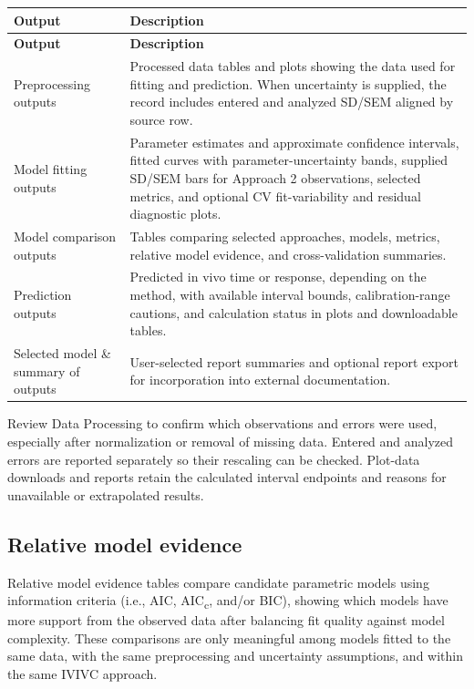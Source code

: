 \begin{longtable}{@{}>{\raggedright\arraybackslash}p{}>{\raggedright\arraybackslash}p{}@{}}
\toprule
\textbf{Output} & \textbf{Description} \\
\midrule
\endfirsthead
\toprule
\textbf{Output} & \textbf{Description} \\
\midrule
\endhead
Preprocessing outputs & Processed data tables and plots showing the data used for fitting and prediction. When uncertainty is supplied, the record includes entered and analyzed SD/SEM aligned by source row. \\
Model fitting outputs & Parameter estimates and approximate confidence intervals, fitted curves with parameter-uncertainty bands, supplied SD/SEM bars for Approach 2 observations, selected metrics, and optional CV fit-variability and residual diagnostic plots. \\
Model comparison outputs & Tables comparing selected approaches, models, metrics, relative model evidence, and cross-validation summaries. \\
Prediction outputs & Predicted in vivo time or response, depending on the method, with available interval bounds, calibration-range cautions, and calculation status in plots and downloadable tables. \\
Selected model \& summary of outputs & User-selected report summaries and optional report export for incorporation into external documentation. \\
\bottomrule
\end{longtable}

Review Data Processing to confirm which observations and errors were used, especially after normalization or removal of missing data. Entered and analyzed errors are reported separately so their rescaling can be checked. Plot-data downloads and reports retain the calculated interval endpoints and reasons for unavailable or extrapolated results.


\subsection{Relative model evidence}

Relative model evidence tables compare candidate parametric models using information criteria (i.e., AIC, AIC\textsubscript{c}, and/or BIC), showing which models have more support from the observed data after balancing fit quality against model complexity. These comparisons are only meaningful among models fitted to the same data, with the same preprocessing and uncertainty assumptions, and within the same IVIVC approach.

